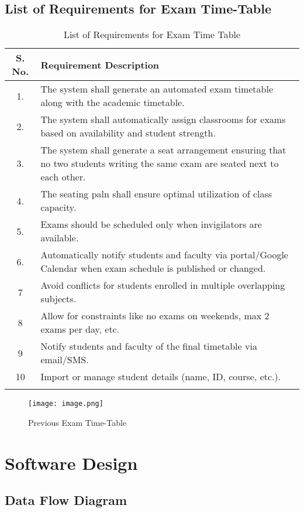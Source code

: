 \documentclass[12pt]{article}
\begin{document}
\subsection{List of Requirements for Exam Time-Table}  
\begin{longtable}{|c|p{15cm}|}
\hline

\textbf{S. No.} & \textbf{Requirement Description} \\\hline
1. & \large The system shall generate an automated exam timetable along with the academic timetable. \\
\hline
2. & \large The system shall automatically assign classrooms for exams based on availability  and student strength. \\
\hline
3. & \large The system shall generate a seat arrangement ensuring that no two students writing the same exam are seated next to each other. \\
\hline
4. & \large The seating paln shall ensure optimal utilization of class capacity. \\
\hline
5. & \large Exams should be scheduled only when invigilators are available. \\
\hline
6. & Automatically notify students and faculty via portal/Google Calendar when exam schedule is published or changed. \\\hline
7 & Avoid conflicts for students enrolled in multiple overlapping subjects. \\ \hline
8 & Allow for constraints like no exams on weekends, max 2 exams per day, etc. \\ \hline
9 & Notify students and faculty of the final timetable via email/SMS. \\ \hline
10 & Import or manage student details (name, ID, course, etc.). \\ \hline
\caption{List of Requirements for Exam Time Table}
    \label{tag:placeholder}
\end{longtable}

\begin{figure}[H]
    \centering
    \texttt{[image: image.png]}
    \caption{Previous Exam Time-Table}
    \label{fig:placeholder}
\end{figure}
\newpage

\section{Software Design}
\subsection{Data Flow Diagram}
\end{document}
